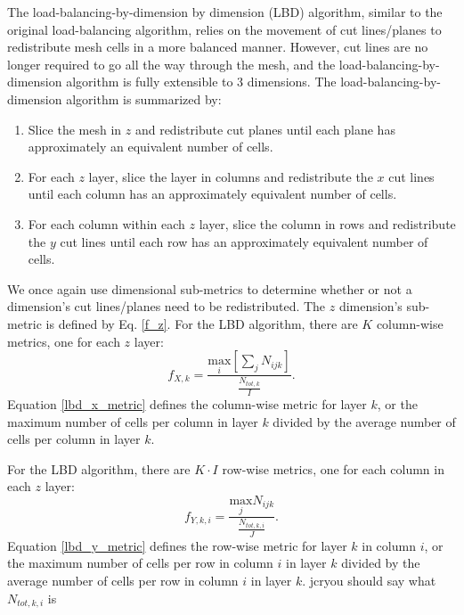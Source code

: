 The load-balancing-by-dimension by dimension (LBD) algorithm, similar to the original load-balancing algorithm, relies on the movement of cut lines/planes to redistribute mesh cells in a more balanced manner.
However, cut lines are no longer required to go all the way through the mesh, and the load-balancing-by-dimension algorithm is fully extensible to 3 dimensions.
The load-balancing-by-dimension algorithm is summarized by:
\begin{enumerate}
  \item Slice the mesh in $z$ and redistribute cut planes until each plane has approximately an equivalent number of cells.
  \item For each $z$ layer, slice the layer in columns and redistribute the $x$ cut lines until each column has an approximately equivalent number of cells.
  \item For each column within each $z$ layer, slice the column in rows and redistribute the $y$ cut lines until each row has an approximately equivalent number of cells.
\end{enumerate}

We once again use dimensional sub-metrics to determine whether or not a dimension's cut lines/planes need to be redistributed. The $z$ dimension's sub-metric is defined by Eq. \ref{f_z}. For the LBD algorithm, there are $K$ column-wise metrics, one for each $z$ layer:
\begin{equation}
f_{X,k} = \frac{ \underset{i}{\text{max}}[ \sum_{j} N_{ijk}]  }  {\frac{N_{tot,k}}{I}}.
\label{lbd_x_metric}
\end{equation}
Equation \ref{lbd_x_metric} defines the column-wise metric for layer $k$, or the maximum number of cells per column in layer $k$ divided by the average number of cells per column in layer $k$.

For the LBD algorithm, there are $K\cdot I$ row-wise metrics, one for each column in each $z$ layer:
\begin{equation}
f_{Y,k,i} = \frac{\underset{j}{\text{max}} N_{ijk} } {\frac{N_{tot,k,i}}{J}}.
\label{lbd_y_metric}
\end{equation}
Equation \ref{lbd_y_metric} defines the row-wise metric for layer $k$ in column $i$, or the maximum number of cells per row in column $i$ in layer $k$ divided by the average number of cells per row in column $i$ in layer $k$. jcr{you should say what $N_{tot,k,i}$ is}

